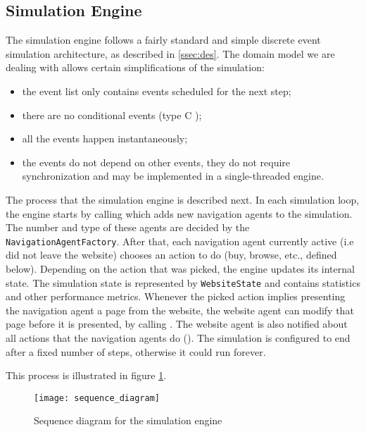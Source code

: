 \subsection{Simulation Engine}

The simulation engine follows a fairly standard and simple discrete event 
simulation architecture, as described in \ref{ssec:des}. The domain model we 
are dealing with allows certain simplifications of the simulation:

\begin{itemize}
    \item the event list only contains events scheduled for the next step;
    \item there are no conditional events (type C \cite{pidd1998computer});
    \item all the events happen instantaneously;
    \item the events do not depend on other events, they do not require 
    synchronization and may be implemented in a single-threaded engine.
\end{itemize}

The process that the simulation engine is described next. In each simulation 
loop, the engine starts by calling  which adds 
new navigation agents to the simulation. The number and type of these agents 
are decided by the \texttt{NavigationAgentFactory}. After that, each 
navigation agent currently active (i.e did not leave the website) chooses an 
action to do (buy, browse, etc., defined below). Depending on the action that 
was picked, the engine updates its internal state. The simulation state is 
represented by \texttt{WebsiteState} and contains statistics and other 
performance metrics. Whenever the picked action implies presenting the 
navigation agent a page from the website, the website agent can modify that 
page before it is presented, by calling . 
The website agent is also notified about all actions that the navigation agents 
do (). The simulation is configured to end 
after a fixed number of steps, otherwise it could run forever.

This process is illustrated in figure \ref{fig:sequence_diagram}. 

\begin{figure}[h]
    \begin{center}
        \leavevmode
        \texttt{[image: sequence\_diagram]}
        \caption{Sequence diagram for the simulation engine}
        \label{fig:sequence_diagram}
    \end{center}
\end{figure}

